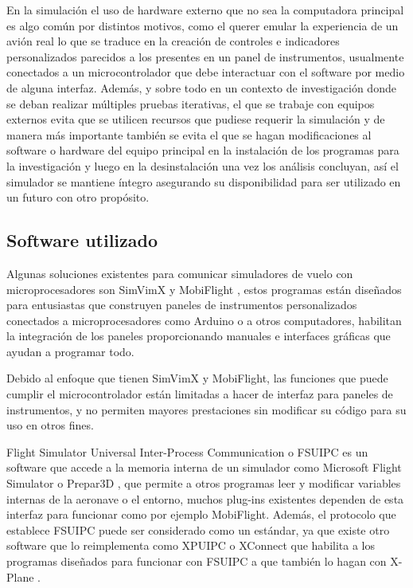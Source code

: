 En la simulación el uso de hardware externo que no sea la computadora principal es algo común por distintos motivos, como el querer emular la experiencia de un avión real lo que se traduce en la creación de controles e indicadores personalizados parecidos a los presentes en un panel de instrumentos, usualmente conectados a un microcontrolador que debe interactuar con el software por medio de alguna interfaz. Además, y sobre todo en un contexto de investigación donde se deban realizar múltiples pruebas iterativas, el que se trabaje con equipos externos evita que se utilicen recursos que pudiese requerir la simulación y de manera más importante también se evita el que se hagan modificaciones al software o hardware del equipo principal en la instalación de los programas para la investigación y luego en la desinstalación una vez los análisis concluyan, así el simulador se mantiene íntegro asegurando su disponibilidad para ser utilizado en un futuro con otro propósito.

\subsection{Software utilizado}

Algunas soluciones existentes para comunicar simuladores de vuelo con microprocesadores son SimVimX \cite{simvimx} y MobiFlight \cite{mobiflight}, estos programas están diseñados para entusiastas que construyen paneles de instrumentos personalizados conectados a microprocesadores como Arduino o a otros computadores, habilitan la integración de los paneles proporcionando manuales e interfaces gráficas que ayudan a programar todo. 

Debido al enfoque que tienen SimVimX y MobiFlight, las funciones que puede cumplir el microcontrolador están limitadas a hacer de interfaz para paneles de instrumentos, y no permiten mayores prestaciones sin modificar su código para su uso en otros fines.

Flight Simulator Universal Inter-Process Communication \cite{fsuipc} o FSUIPC es un software que accede a la memoria interna de un simulador como Microsoft Flight Simulator \cite{msfs} o Prepar3D \cite{prepar3d}, que permite a otros programas leer y modificar variables internas de la aeronave o el entorno, muchos plug-ins existentes dependen de esta interfaz para funcionar como por ejemplo MobiFlight. Además, el protocolo que establece FSUIPC puede ser considerado como un estándar, ya que existe otro software que lo reimplementa como XPUIPC \cite{xpuipc} o XConnect \cite{xc} que habilita a los programas diseñados para funcionar con FSUIPC a que también lo hagan con X-Plane \cite{xplane}.

